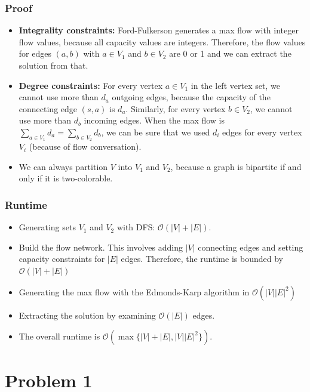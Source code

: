 \documentclass[12pt]{article}
\begin{document}
\subsubsection*{Proof}
\begin{itemize}
	\item \textbf{Integrality constraints:} Ford-Fulkerson generates a max flow with integer flow values, because all capacity values are integers. Therefore, the flow values for edges $(a,b)$ with $a \in V_1$ and $b \in V_2$ are 0 or 1 and we can extract the solution from that.
	\item \textbf{Degree constraints:} For every vertex $a \in V_1$ in the left vertex set, we cannot use more than $d_a$ outgoing edges, because the capacity of the connecting edge $(s, a)$ is $d_a$. Similarly, for every vertex $b \in V_2$, we cannot use more than $d_b$ incoming edges. When the max flow is $\sum_{a \in V_1} d_a = \sum_{b \in V_2} d_b$, we can be sure that we used $d_i$ edges for every vertex $V_i$ (because of flow conversation).
	\item We can always partition $V$ into $V_1$ and $V_2$, because a graph is bipartite if and only if it is two-colorable.
\end{itemize}

\subsubsection*{Runtime}
\begin{itemize}
	\item Generating sets $V_1$ and $V_2$ with DFS: $\mathcal{O}(|V| + |E|)$.
	\item Build the flow network. This involves adding $|V|$ connecting edges and setting capacity constraints for $|E|$ edges. Therefore, the runtime is bounded by $\mathcal{O}(|V| + |E|)$
	\item Generating the max flow with the Edmonds-Karp algorithm in $\mathcal{O}(|V||E|^2)$
	\item Extracting the solution by examining $\mathcal{O}(|E|)$ edges.
	\item The overall runtime is $\mathcal{O}(\max \{ |V| + |E|, |V||E|^2 \})$.
\end{itemize}

\section*{Problem 1}
\end{document}

